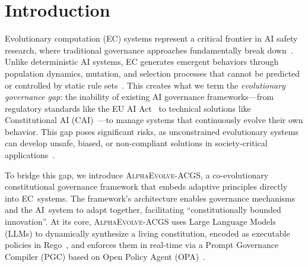 \documentclass[10pt,twocolumn]{article}
\newcommand{\acgs}{\textsc{AlphaEvolve-ACGS}}
\theoremstyle{definition}
\begin{document}
\section{Introduction}
\label{sec:introduction}
Evolutionary computation (EC) systems represent a critical frontier in AI safety research, where traditional governance approaches fundamentally break down~\cite{amodei2016concrete,russell2019human}. Unlike deterministic AI systems, EC generates emergent behaviors through population dynamics, mutation, and selection processes that cannot be predicted or controlled by static rule sets~\cite{russell2020artificial}. This creates what we term the \textit{evolutionary governance gap}: the inability of existing AI governance frameworks---from regulatory standards like the EU AI Act~\cite{eu2024ai} to technical solutions like Constitutional AI (CAI)~\cite{anthropic2022constitutional}---to manage systems that continuously evolve their own behavior. This gap poses significant risks, as unconstrained evolutionary systems can develop unsafe, biased, or non-compliant solutions in society-critical applications~\cite{barocas2019fairness,acgs2024}.

To bridge this gap, we introduce \acgs{}, a co-evolutionary constitutional governance framework that embeds adaptive principles directly into EC~systems. The framework's architecture enables governance mechanisms and the AI~system to adapt together, facilitating ``constitutionally bounded innovation''. At its core, \acgs{} uses Large Language Models (LLMs) to dynamically synthesize a living constitution, encoded as executable policies in Rego~\cite{rego2019}, and enforces them in real-time via a Prompt Governance Compiler (PGC) based on Open Policy Agent (OPA)~\cite{opa2023}.
\end{document}
